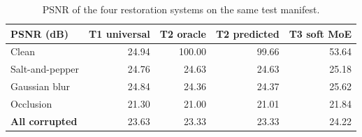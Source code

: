 \begin{table}[t]
\centering
\caption{PSNR of the four restoration systems on the same test manifest.}
\label{tab:compare}
\footnotesize
\begin{tabular}{lrrrr}
\toprule
PSNR (dB) & T1 universal & T2 oracle & T2 predicted & T3 soft MoE \\
\midrule
Clean & 24.94 & 100.00 & 99.66 & 53.64 \\
Salt-and-pepper & 24.76 & 24.63 & 24.63 & 25.18 \\
Gaussian blur & 24.84 & 24.36 & 24.37 & 25.62 \\
Occlusion & 21.30 & 21.00 & 21.01 & 21.84 \\
\textbf{All corrupted} & 23.63 & 23.33 & 23.33 & 24.22 \\
\bottomrule
\end{tabular}
\end{table}
